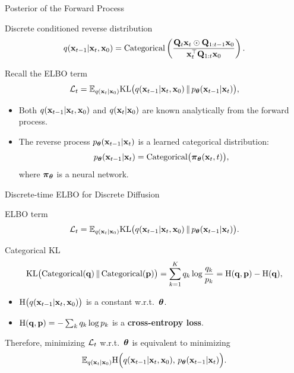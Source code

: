 \documentclass{beamer}
\renewcommand{\eqpause}{}
\begin{document}
\begin{frame}{Posterior of the Forward Process}
	\begin{block}{Discrete conditioned reverse distribution}
		\[
			q(\mathbf{x}_{t-1} | \mathbf{x}_t, \mathbf{x}_0)
			= \mathrm{Categorical}\left(\frac{\mathbf{Q}_t \mathbf{x}_t \odot \mathbf{Q}_{1:t-1} \mathbf{x}_0}{\mathbf{x}_t^{\top}\mathbf{Q}_{1:t}\mathbf{x}_0}\right).
		\]
		\vspace{-0.3cm}
	\end{block}
	\eqpause
	Recall the ELBO term
	\[
		\mathcal{L}_t
		= \mathbb{E}_{q(\mathbf{x}_t | \mathbf{x}_0)}
		\mathrm{KL}\bigl(q(\mathbf{x}_{t-1} | \mathbf{x}_t, \mathbf{x}_0) \,\|\, p_{\boldsymbol{\theta}}(\mathbf{x}_{t-1} | \mathbf{x}_t)\bigr),
	\]
	\eqpause
	\vspace{-0.5cm}
	\begin{itemize}
		\item Both $q(\mathbf{x}_{t-1} | \mathbf{x}_t, \mathbf{x}_0)$ and $q(\mathbf{x}_t | \mathbf{x}_0)$ are known analytically from the forward process.
		\item The reverse process $p_{\boldsymbol{\theta}}(\mathbf{x}_{t-1} | \mathbf{x}_t)$ is a learned categorical distribution:
		\[
			p_{\boldsymbol{\theta}}(\mathbf{x}_{t-1} | \mathbf{x}_t) = \mathrm{Categorical}\bigl( \boldsymbol{\pi}_{\boldsymbol{\theta}}(\mathbf{x}_t, t) \bigr),
		\]
		where $\boldsymbol{\pi}_{\boldsymbol{\theta}}$ is a neural network.
	\end{itemize}
\end{frame}
\begin{frame}{Discrete-time ELBO for Discrete Diffusion}

	\begin{block}{ELBO term}
		\vspace{-0.3cm}
		\[
			\mathcal{L}_t
			= \mathbb{E}_{q(\mathbf{x}_t | \mathbf{x}_0)}
			\mathrm{KL}\bigl(q(\mathbf{x}_{t-1} | \mathbf{x}_t, \mathbf{x}_0) \,\|\, p_{\boldsymbol{\theta}}(\mathbf{x}_{t-1} | \mathbf{x}_t)\bigr).
		\]
		\vspace{-0.3cm}
	\end{block}
	\eqpause
	\begin{block}{Categorical KL}
		\vspace{-0.3cm}
		\[
			\mathrm{KL}\bigl(\mathrm{Categorical}(\mathbf{q}) \,\|\, \mathrm{Categorical}(\mathbf{p})\bigr)
			= \sum_{k=1}^K q_k \log \frac{q_k}{p_k}
			= \mathrm{H}(\mathbf{q},\mathbf{p}) - \mathrm{H}(\mathbf{q}),
		\]
		\eqpause
		\begin{itemize}
			\item $\mathrm{H}\bigl(q(\mathbf{x}_{t-1} | \mathbf{x}_t, \mathbf{x}_0)\bigr)$ is a constant w.r.t.~$\boldsymbol{\theta}$.
			\item $\mathrm{H}(\mathbf{q},\mathbf{p}) = -\sum_k q_k \log p_k$ is a \textbf{cross-entropy loss}.
		\end{itemize}
	\end{block}
	\eqpause
	Therefore, minimizing $\mathcal{L}_t$ w.r.t.~$\boldsymbol{\theta}$ is equivalent to minimizing
	\[
		\mathbb{E}_{q(\mathbf{x}_t | \mathbf{x}_0)}
		\mathrm{H}\Bigl(q(\mathbf{x}_{t-1} | \mathbf{x}_t, \mathbf{x}_0),\, p_{\boldsymbol{\theta}}(\mathbf{x}_{t-1} | \mathbf{x}_t)\Bigr).
	\]
\end{frame}
\end{document}
